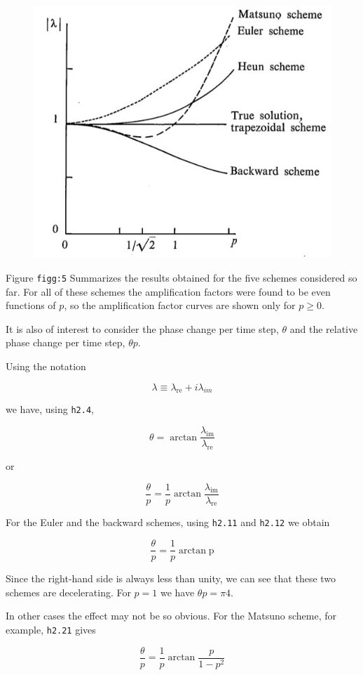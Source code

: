 \begin{figure}
    \centering
    \includegraphics[width = .7 \textwidth]{figs/NM/pic5.jpg}
    \caption{} \label{fig:}
\end{figure}

Figure \texttt{figg:5} Summarizes the results obtained for the five
schemes considered so far. For all of these schemes the amplification
factors were found to be even functions of \(p\), so the amplification
factor curves are shown only for \(p \geq 0\).

It is also of interest to consider the phase change per time step,
\(\theta\) and the relative phase change per time step, \(\theta p\).

Using the notation

\[\lambda \equiv \lambda_{\text{re}} + i\lambda_{im}\]

we have, using \texttt{h2.4},

\[\theta = \arctan\frac{\lambda_{\text{im}}}{\lambda_{\text{re}}}\]

or

\[\frac{\theta}{p} = \frac{1}{p}\arctan\frac{\lambda_{\text{im}}}{\lambda_{\text{re}}}\]

For the Euler and the backward schemes, using \texttt{h2.11} and
\texttt{h2.12} we obtain

\[\frac{\theta}{p} = \frac{1}{p}\arctan\text{p}\]

Since the right-hand side is always less than unity, we can see that
these two schemes are decelerating. For \(p = 1\) we have
\(\theta p = \pi 4\).

In other cases the effect may not be so obvious. For the Matsuno scheme,
for example, \texttt{h2.21} gives

\[\frac{\theta}{p} = \frac{1}{p}\arctan\frac{p}{1 - p^{2}}\]

